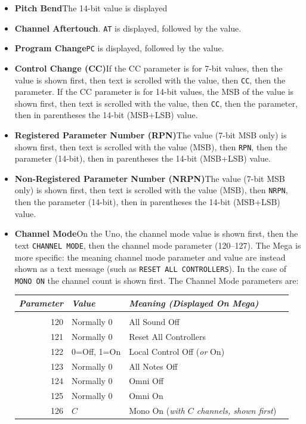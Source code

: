 \documentclass{article}
\begin{document}
\begin{itemize}
\item {\bf Pitch Bend}\quad The 14-bit value is displayed
\item {\bf Channel Aftertouch}.  \texttt{AT} is displayed, followed by the value.
\item {\bf Program Change}\quad \texttt{PC} is displayed, followed by the value.
\item {\bf Control Change (CC)}\quad If the CC parameter is for 7-bit values, then the value is shown first, then text is scrolled with the value, then \texttt{CC}, then the parameter.  If the CC parameter is for 14-bit values, the MSB of the value is shown first, then text is scrolled with the value, then \texttt{CC}, then the parameter, then in parentheses the 14-bit (MSB+LSB) value.
\item {\bf Registered Parameter Number (RPN)}\quad The value (7-bit MSB only) is shown first, then text is scrolled with the value (MSB), then \texttt{RPN}, then the parameter (14-bit), then in parentheses the 14-bit (MSB+LSB) value.
\item {\bf Non-Registered Parameter Number (NRPN)}\quad The value (7-bit MSB only) is shown first, then text is scrolled with the value (MSB), then \texttt{NRPN}, then the parameter (14-bit), then in parentheses the 14-bit (MSB+LSB) value.
\item {\bf Channel Mode}\quad On the Uno, the channel mode value is shown first, then the text \texttt{CHANNEL MODE}, then the channel mode parameter (120--127).  The Mega is more specific: the meaning channel mode parameter and value are instead shown as a text message (such as \texttt{RESET ALL CONTROLLERS}).  In the case of \texttt{MONO ON} the channel count is shown first.  The Channel Mode parameters are:
\begin{center}\begin{tabular}{@{}rlll@{}}
{\it Parameter}&{\it Value}&{\it Meaning (Displayed On Mega)}\\[0.1em]
\hline\\[-0.9em]
120&Normally 0&All Sound Off\\
121&Normally 0&Reset All Controllers\\
122&0=Off, 1=On&Local Control Off ({\it or} On)\\
123&Normally 0&All Notes Off\\
124&Normally 0&Omni Off\\
125&Normally 0&Omni On\\
126&\(C\)&Mono On ({\it with \(C\) channels, shown first})\\

\end{tabular}
\end{center}
\end{itemize}
\end{document}
